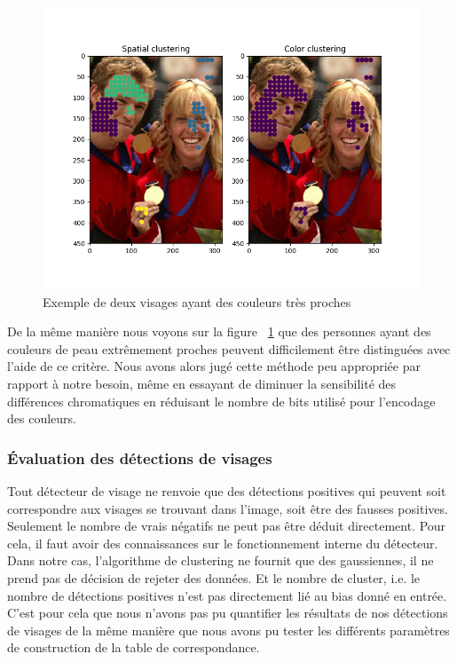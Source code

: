 \documentclass[a4paper,11pt]{article}
\begin{document}
\begin{figure}[H]
\begin{center}
    \includegraphics[scale=0.5]{color_clustering_close.png}
    \caption{Exemple de deux visages ayant des couleurs très proches} \end{center}
    \label{fig:color_clustering_close}
\end{figure}
De la même manière nous voyons sur la figure ~\ref{fig:color_clustering_close} que des personnes ayant des couleurs de peau extrêmement proches peuvent difficilement être distinguées avec l'aide de ce critère.
\newline
Nous avons alors jugé cette méthode peu appropriée par rapport à notre besoin, même en essayant de diminuer la sensibilité des différences chromatiques en réduisant le nombre de bits utilisé pour l'encodage des couleurs.
\subsubsection{Évaluation des détections de visages}
Tout détecteur de visage ne renvoie que des détections positives qui peuvent soit correspondre aux visages se trouvant dans l'image, soit être des fausses positives.
Seulement le nombre de vrais négatifs ne peut pas être déduit directement.
Pour cela, il faut avoir des connaissances sur le fonctionnement interne du détecteur.
\newline
Dans notre cas, l'algorithme de clustering ne fournit que des gaussiennes, il ne prend pas de décision de rejeter des données.
Et le nombre de cluster, i.e. le nombre de détections positives n'est pas directement lié au bias donné en entrée.
C'est pour cela que nous n'avons pas pu quantifier les résultats de nos détections de visages de la même manière que nous avons pu tester les différents paramètres de construction de la table de correspondance.
\end{document}
